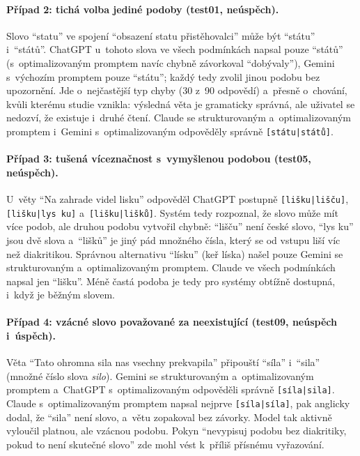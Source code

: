 \documentclass[11pt,a4paper]{article}
\begin{document}
\paragraph{Případ 2: tichá volba jediné podoby (test01, neúspěch).}
Slovo \enquote{statu} ve spojení \enquote{obsazení statu přistěhovalci}
může být \enquote{státu} i~\enquote{států}. ChatGPT u~tohoto slova ve
všech podmínkách napsal pouze \enquote{států} (s~optimalizovaným
promptem navíc chybně závorkoval \enquote{dobývaly}), Gemini s~výchozím promptem pouze
\enquote{státu}; každý tedy zvolil jinou podobu bez upozornění. Jde
o~nejčastější typ chyby (30 z~90 odpovědí) a~přesně o~chování, kvůli
kterému studie vznikla: výsledná věta je gramaticky správná, ale
uživatel se nedozví, že existuje i~druhé čtení. Claude se
strukturovaným a~optimalizovaným promptem i~Gemini s~optimalizovaným
odpověděly správně \texttt{[státu|států]}.

\paragraph{Případ 3: tušená víceznačnost s~vymyšlenou podobou (test05, neúspěch).}
U~věty \enquote{Na zahrade videl lisku} odpověděl ChatGPT postupně
\texttt{[lišku|lišču]}, \texttt{[lišku|lys ku]} a~\texttt{[lišku|lišků]}.
Systém tedy rozpoznal, že slovo může mít více podob, ale druhou
podobu vytvořil chybně: \enquote{lišču} není české slovo, \enquote{lys
ku} jsou dvě slova a~\enquote{lišků} je jiný pád množného čísla, který
se od vstupu liší víc než diakritikou. Správnou alternativu
\enquote{lísku} (keř líska) našel pouze Gemini se strukturovaným
a~optimalizovaným promptem. Claude ve všech podmínkách napsal jen
\enquote{lišku}. Méně častá podoba je tedy pro systémy obtížně
dostupná, i~když je běžným slovem.

\paragraph{Případ 4: vzácné slovo považované za neexistující (test09, neúspěch i~úspěch).}
Věta \enquote{Tato ohromna sila nas vsechny prekvapila} připouští
\enquote{síla} i~\enquote{sila} (množné číslo slova \emph{silo}).
Gemini se strukturovaným a~optimalizovaným promptem a~ChatGPT
s~optimalizovaným odpověděli správně \texttt{[síla|sila]}. Claude
s~optimalizovaným promptem napsal nejprve \texttt{[síla|síla]}, pak
anglicky dodal, že \enquote{sila} není slovo, a~větu zopakoval bez
závorky. Model tak aktivně vyloučil platnou, ale vzácnou podobu. Pokyn
\enquote{nevypisuj podobu bez diakritiky, pokud to není skutečné
slovo} zde mohl vést k~příliš přísnému vyřazování.
\end{document}
